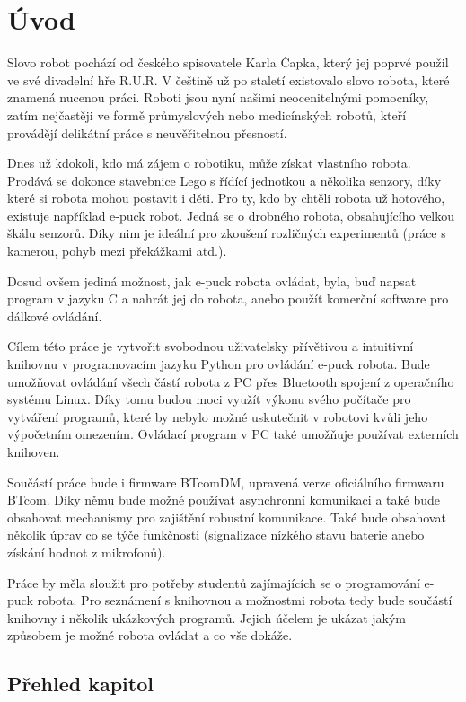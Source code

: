 \chapter*{Úvod}

Slovo robot pochází od českého spisovatele Karla Čapka, který jej poprvé
použil ve své divadelní hře R.U.R. V češtině už po staletí existovalo slovo
robota, které znamená nucenou práci. Roboti jsou nyní našimi neocenitelnými
pomocníky, zatím nejčastěji ve formě průmyslových nebo medicínských robotů,
kteří provádějí delikátní práce s neuvěřitelnou přesností.

Dnes už kdokoli, kdo má zájem o robotiku, může získat vlastního robota.
Prodává se dokonce stavebnice Lego s řídící jednotkou a několika senzory,
díky které si robota mohou postavit i děti. Pro ty, kdo by chtěli robota už
hotového, existuje například e-puck \cite{epuck} robot. Jedná se o drobného
robota, obsahujícího velkou škálu senzorů. Díky nim je ideální pro zkoušení
rozličných experimentů (práce s kamerou, pohyb mezi překážkami atd.).

Dosud ovšem jediná možnost, jak e-puck robota ovládat, byla, buď napsat program
v jazyku C a nahrát jej do robota, anebo použít komerční software pro dálkové
ovládání.

Cílem této práce je vytvořit svobodnou uživatelsky přívětivou a intuitivní
knihovnu v programovacím jazyku Python pro ovládání e-puck robota. Bude
umožňovat ovládání všech částí robota z PC přes Bluetooth spojení z operačního
systému Linux. Díky tomu budou moci využít výkonu svého počítače pro vytváření
programů, které by nebylo možné uskutečnit v robotovi kvůli jeho výpočetním
omezením. Ovládací program v PC také umožňuje používat externích knihoven.

Součástí práce bude i firmware BTcomDM, upravená verze oficiálního firmwaru
BTcom. Díky němu bude možné používat asynchronní komunikaci a také bude
obsahovat mechanismy pro zajištění robustní komunikace. Také bude obsahovat
několik úprav co se týče funkčnosti (signalizace nízkého stavu baterie anebo
získání hodnot z mikrofonů).

Práce by měla sloužit pro potřeby studentů zajímajících se o programování
e-puck robota. Pro seznámení s knihovnou a možnostmi robota tedy bude součástí
knihovny i několik ukázkových programů. Jejich účelem je ukázat jakým způsobem
je možné robota ovládat a co vše dokáže.

\section*{Přehled kapitol}


